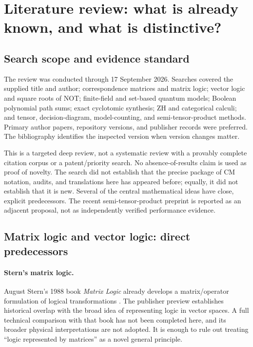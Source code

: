 \section{Literature review: what is already known, and what is distinctive?}\label{sec:literature}
\subsection{Search scope and evidence standard}
The review was conducted through 17 September 2026. Searches covered the supplied title and author; correspondence matrices and matrix logic; vector logic and square roots of NOT; finite-field and set-based quantum models; Boolean polynomial path sums; exact cyclotomic synthesis; ZH and categorical calculi; and tensor, decision-diagram, model-counting, and semi-tensor-product methods. Primary author papers, repository versions, and publisher records were preferred. The bibliography identifies the inspected version when version changes matter.

This is a targeted deep review, not a systematic review with a provably complete citation corpus or a patent/priority search. No absence-of-results claim is used as proof of novelty. The search did not establish that the precise package of CM notation, audits, and translations here has appeared before; equally, it did not establish that it is new. Several of the central mathematical ideas have close, explicit predecessors. The recent semi-tensor-product preprint is reported as an adjacent proposal, not as independently verified performance evidence.

\subsection{Matrix logic and vector logic: direct predecessors}
\paragraph{Stern's matrix logic.}
August Stern's 1988 book \emph{Matrix Logic} already develops a matrix/operator formulation of logical transformations \cite{stern1988}. The publisher preview establishes historical overlap with the broad idea of representing logic in vector spaces. A full technical comparison with that book has not been completed here, and its broader physical interpretations are not adopted. It is enough to rule out treating ``logic represented by matrices'' as a novel general principle.

